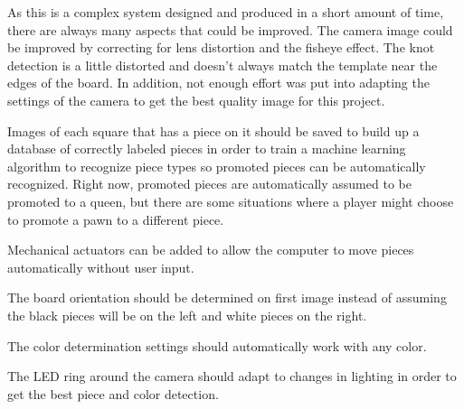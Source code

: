 \documentclass[journal]{IEEEtran}
\begin{document}
As this is a complex system designed and produced in a short amount of time, there are always many aspects that could be improved.
The camera image could be improved by correcting for lens distortion and the fisheye effect. The knot detection is a little distorted and doesn't always match the template near the edges of the board. In addition, not enough effort was put into adapting the settings of the camera to get the best quality image for this project.

Images of each square that has a piece on it should be saved to build up a database of correctly labeled pieces in order to train a machine learning algorithm to recognize piece types so promoted pieces can be automatically recognized. Right now, promoted pieces are automatically assumed to be promoted to a queen, but there are some situations where a player might choose to promote a pawn to a different piece.

Mechanical actuators can be added to allow the computer to move pieces automatically without user input.

The board orientation should be determined on first image instead of assuming the black pieces will be on the left and white pieces on the right.

The color determination settings should automatically work with any color.

The LED ring around the camera should adapt to changes in lighting in order to get the best piece and color detection.


%
\end{document}
